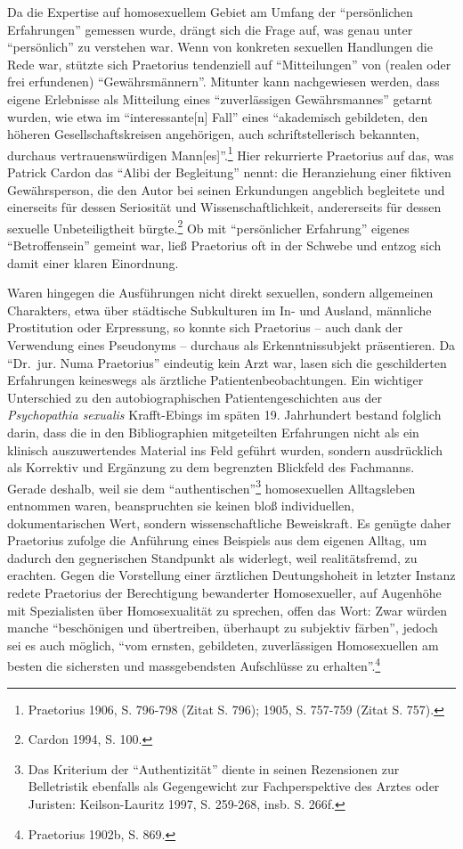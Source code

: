\documentclass[a4paper,
fontsize=11pt,
oneside,
numbers=noperiodatend,
parskip=half-,
bibliography=totoc,
final
]{scrartcl}
\begin{document}
Da die Expertise auf homosexuellem Gebiet am Umfang der
\enquote{persönlichen Erfahrungen} gemessen wurde, drängt sich die Frage
auf, was genau unter \enquote{persönlich} zu verstehen war. Wenn von
konkreten sexuellen Handlungen die Rede war, stützte sich Praetorius
tendenziell auf \enquote{Mitteilungen} von (realen oder frei erfundenen)
\enquote{Gewährsmännern}. Mitunter kann nachgewiesen werden, dass eigene
Erlebnisse als Mitteilung eines \enquote{zuverlässigen Gewährsmannes}
getarnt wurden, wie etwa im \enquote{interessante{[}n{]} Fall} eines
\enquote{akademisch gebildeten, den höheren Gesellschaftskreisen
angehörigen, auch schriftstellerisch bekannten, durchaus
vertrauenswürdigen Mann{[}es{]}}.\footnote{Praetorius 1906, S. 796-798
  (Zitat S. 796); 1905, S. 757-759 (Zitat S. 757).} Hier rekurrierte
Praetorius auf das, was Patrick Cardon das \enquote{Alibi der
Begleitung} nennt: die Heranziehung einer fiktiven Gewährsperson, die
den Autor bei seinen Erkundungen angeblich begleitete und einerseits für
dessen Seriosität und Wissenschaftlichkeit, andererseits für dessen
sexuelle Unbeteiligtheit bürgte.\footnote{Cardon 1994, S. 100.} Ob mit
\enquote{persönlicher Erfahrung} eigenes \enquote{Betroffensein} gemeint
war, ließ Praetorius oft in der Schwebe und entzog sich damit einer
klaren Einordnung.

Waren hingegen die Ausführungen nicht direkt sexuellen, sondern
allgemeinen Charakters, etwa über städtische Subkulturen im In- und
Ausland, männliche Prostitution oder Erpressung, so konnte sich
Praetorius -- auch dank der Verwendung eines Pseudonyms -- durchaus als
Erkenntnissubjekt präsentieren. Da \enquote{Dr.~jur. Numa Praetorius}
eindeutig kein Arzt war, lasen sich die geschilderten Erfahrungen
keineswegs als ärztliche Patientenbeobachtungen. Ein wichtiger
Unterschied zu den autobiographischen Patientengeschichten aus der
\emph{Psychopathia sexualis} Krafft-Ebings im späten 19. Jahrhundert
bestand folglich darin, dass die in den Bibliographien mitgeteilten
Erfahrungen nicht als ein klinisch auszuwertendes Material ins Feld
geführt wurden, sondern ausdrücklich als Korrektiv und Ergänzung zu dem
begrenzten Blickfeld des Fachmanns. Gerade deshalb, weil sie dem
\enquote{authentischen}\footnote{Das Kriterium der
  \enquote{Authentizität} diente in seinen Rezensionen zur Belletristik
  ebenfalls als Gegengewicht zur Fachperspektive des Arztes oder
  Juristen: Keilson-Lauritz 1997, S. 259-268, insb. S. 266f.}
homosexuellen Alltagsleben entnommen waren, beanspruchten sie keinen
bloß individuellen, dokumentarischen Wert, sondern wissenschaftliche
Beweiskraft. Es genügte daher Praetorius zufolge die Anführung eines
Beispiels aus dem eigenen Alltag, um dadurch den gegnerischen Standpunkt
als widerlegt, weil realitätsfremd, zu erachten. Gegen die Vorstellung
einer ärztlichen Deutungshoheit in letzter Instanz redete Praetorius der
Berechtigung bewanderter Homosexueller, auf Augenhöhe mit Spezialisten
über Homosexualität zu sprechen, offen das Wort: Zwar würden manche
\enquote{beschönigen und übertreiben, überhaupt zu subjektiv färben},
jedoch sei es auch möglich, \enquote{vom ernsten, gebildeten,
zuverlässigen Homosexuellen am besten die sichersten und massgebendsten
Aufschlüsse zu erhalten}.\footnote{Praetorius 1902b, S. 869.}
\end{document}
